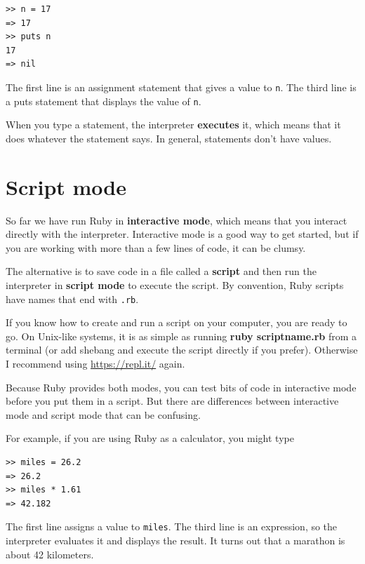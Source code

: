 \documentclass[10pt]{book}
\begin{document}
\begin{verbatim}
>> n = 17
=> 17
>> puts n
17
=> nil
\end{verbatim}
%
The first line is an assignment statement that gives a value to
{\tt n}.  The third line is a puts statement that displays the
value of {\tt n}.

When you type a statement, the interpreter {\bf executes} it,
which means that it does whatever the statement says.  In general,
statements don't have values.


\section{Script mode}

So far we have run Ruby in {\bf interactive mode}, which
means that you interact directly with the interpreter.
Interactive mode is a good way to get started,
but if you are working with more than a few lines of code, it can be
clumsy.

The alternative is to save code in a file called a {\bf script} and
then run the interpreter in {\bf script mode} to execute the script.  By
convention, Ruby scripts have names that end with {\tt .rb}.

If you know how to create and run a script on your computer, you
are ready to go.  On Unix-like systems, it is as simple as running
{\bf ruby scriptname.rb} from a terminal (or add shebang
and execute the script directly if you prefer). Otherwise I
recommend using \url{https://repl.it/} again.

Because Ruby provides both modes,
you can test bits of code in interactive mode before you put them
in a script.  But there are differences between interactive mode
and script mode that can be confusing.

For example, if you are using Ruby as a calculator, you might type

\begin{verbatim}
>> miles = 26.2
=> 26.2
>> miles * 1.61
=> 42.182
\end{verbatim}

The first line assigns a value to {\tt miles}.  The
third line is an expression, so the
interpreter evaluates it and displays the result.  It turns out that a
marathon is about 42 kilometers.
\end{document}
